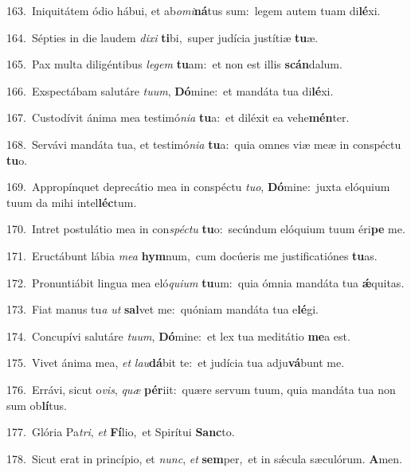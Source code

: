 {\numbfont\textcolor{\numbcolor}{163.}}~Iniquitátem ódio hábui, et ab\-\textit{o}\-\textit{mi}\textbf{ná}tus sum:~\star legem autem tuam di\-\textbf{lé}\-xi.\par
{\numbfont\textcolor{\numbcolor}{164.}}~Sépties in die laudem \textit{di}\-\textit{xi} \textbf{ti}\-bi,~\star super judícia justítiæ \textbf{tu}\-æ.\par
{\numbfont\textcolor{\numbcolor}{165.}}~Pax multa diligéntibus \textit{le}\-\textit{gem} \textbf{tu}\-am:~\star et non est illis \textbf{scán}\-dalum.\par
{\numbfont\textcolor{\numbcolor}{166.}}~Exspectábam salutáre \textit{tu}\-\textit{um}, \textbf{Dó}\-mine:~\star et mandáta tua di\-\textbf{lé}\-xi.\par
{\numbfont\textcolor{\numbcolor}{167.}}~Custodívit ánima mea testimó\-\textit{ni}\-\textit{a} \textbf{tu}\-a:~\star et diléxit ea vehe\-\textbf{mén}\-ter.\par
{\numbfont\textcolor{\numbcolor}{168.}}~Servávi mandáta tua, et testimó\-\textit{ni}\-\textit{a} \textbf{tu}\-a:~\star quia omnes viæ meæ in conspéctu \textbf{tu}\-o.\par
{\numbfont\textcolor{\numbcolor}{169.}}~Appropínquet deprecátio mea in conspéctu \textit{tu}\-\textit{o}, \textbf{Dó}\-mine:~\star juxta elóquium tuum da mihi intel\-\textbf{léc}\-tum.\par
{\numbfont\textcolor{\numbcolor}{170.}}~Intret postulátio mea in con\-\textit{spéc}\-\textit{tu} \textbf{tu}\-o:~\star secúndum elóquium tuum éri\textbf{pe} me.\par
{\numbfont\textcolor{\numbcolor}{171.}}~Eructábunt lábia \textit{me}\-\textit{a} \textbf{hym}\-num,~\star cum docúeris me justificatiónes \textbf{tu}\-as.\par
{\numbfont\textcolor{\numbcolor}{172.}}~Pronuntiábit lingua mea eló\-\textit{qui}\-\textit{um} \textbf{tu}\-um:~\star quia ómnia mandáta tua \textbf{ǽ}\-quitas.\par
{\numbfont\textcolor{\numbcolor}{173.}}~Fiat manus tu\textit{a} \textit{ut} \textbf{sal}\-vet me:~\star quóniam mandáta tua e\-\textbf{lé}\-gi.\par
{\numbfont\textcolor{\numbcolor}{174.}}~Concupívi salutáre \textit{tu}\-\textit{um}, \textbf{Dó}\-mine:~\star et lex tua meditátio \textbf{me}\-a est.\par
{\numbfont\textcolor{\numbcolor}{175.}}~Vivet ánima mea, \textit{et} \textit{lau}\-\textbf{dá}bit te:~\star et judícia tua adju\-\textbf{vá}\-bunt me.\par
{\numbfont\textcolor{\numbcolor}{176.}}~Errávi, sicut o\-\textit{vis}\-, \textit{quæ} \textbf{pér}\-iit:~\star quære servum tuum, quia mandáta tua non sum ob\-\textbf{lí}\-tus.\par
{\numbfont\textcolor{\numbcolor}{177.}}~Glória Pa\-\textit{tri}\-, \textit{et} \textbf{Fí}\-lio,~\star et Spirítui \textbf{Sanc}\-to.\par
{\numbfont\textcolor{\numbcolor}{178.}}~Sicut erat in princípio, et \textit{nunc}\-, \textit{et} \textbf{sem}\-per,~\star et in sǽcula sæculórum. \textbf{A}\-men.\par
